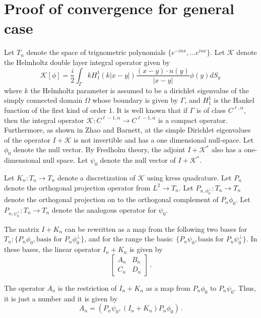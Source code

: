 \section{Proof of convergence for general case}
\label{sec:appb}
Let $T_{n}$ denote the space of trignometric polynomials
$\{ e^{-inx}, \ldots e^{inx} \}$. 
Let $\mathcal{K}$ denote the Helmholtz double layer integral operator
given by
\begin{equation}
\mathcal{K}[\phi] = \frac{i}{2}\int_{\Gamma} k H_{1}^{1}(k|x-y|) \frac{(x-y)\cdot n(y)}{|x-y|} \phi(y) dS_{y} \,
\end{equation}
where $k$ the Helmholtz parameter is assumed to be a dirichlet eigenvalue of the simply connected
domain $\Omega$ whose boundary is given by $\Gamma$, and $H_{1}^{1}$ is the Hankel function
of the first kind of order $1$.
It is well known that if $\Gamma$ is of class $C^{\ell,\alpha}$, then the
integral operator $\mathcal{K}: C^{\ell-1,\alpha} \to C^{\ell-1,\alpha}$ is a compact operator.
Furthermore, as shown in Zhao and Barnett, at the simple Dirichlet eigenvalues of the operator
$I + \mathcal{K}$ is not invertible and has a one dimensional null-space. Let $\phi_{0}$ denote
the null vector. 
By Fredholm theory, the adjoint $I + \mathcal{K}^{\ast}$ also has a one-dimensional null space.
Let $\psi_{0}$ denote the null vector of $I+\mathcal{K}^{\ast}$.


Let $K_{n}: T_{n} \to T_{n}$ 
denote a discretization of $\mathcal{K}$ 
using kress quadrature. 
Let $P_{n}$ denote the orthogonal 
projection operator from $L^{2} \to T_{n}$.
Let $P_{n,\phi_{0}^{\perp}}: T_{n} \to T_{n}$ denote the orthogonal
projection on to the orthogonal complement of $P_{n} \phi_{0}$.
Let $P_{n,\psi_{0}^{\perp}}: T_{n} \to T_{n}$ denote the
analogous operator for $\psi_{0}$. 

The matrix $I+K_{n}$ can be rewritten as a map from the
following two bases for $T_{n}: \{ P_{n} \phi_{0}, \text{basis for }
P_{n}\phi_{0}^{\perp} \}$, and for the range the basis:
$\{ P_{n} \psi_{0}, \text{basis for } P_{n} \psi_{0}^{\perp} \}$.
In these bases, the linear operator $I_{n} + K_{n}$ is given by
\begin{equation}
\begin{bmatrix}
A_{n} & B_{n} \\
C_{n} & D_{n} 
\end{bmatrix} \, .
\end{equation}

The operator $A_{n}$
is the restriction of $I_{n} + K_{n}$ as a map from $P_{n} \phi_{0}$ 
to $P_{n} \psi_{0}$. Thus, it is just a number and it is given by
\begin{equation}
A_{n} = \left(P_{n} \psi_{0}, (I_{n} + K_{n}) P_{n} \phi_{0} \right) \,.
\end{equation}

